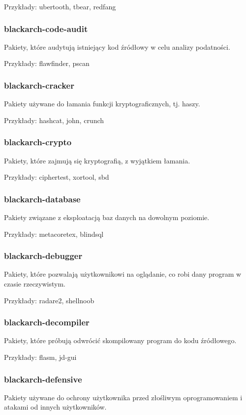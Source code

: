 \documentclass[a4paper, oneside, 11pt]{book}
\begin{document}
Przykłady: ubertooth, tbear, redfang

\subsubsection{blackarch-code-audit}
Pakiety, które audytują istniejący kod źródłowy w celu analizy podatności.

Przykłady: flawfinder, pscan

\subsubsection{blackarch-cracker}
Pakiety używane do łamania funkcji kryptograficznych, tj. haszy.

Przykłady: hashcat, john, crunch

\subsubsection{blackarch-crypto}
Pakiety, które zajmują się kryptografią, z wyjątkiem łamania.

Przykłady: ciphertest, xortool, sbd

\subsubsection{blackarch-database}
Pakiety związane z eksploatacją baz danych na dowolnym poziomie.

Przykłady: metacoretex, blindsql

\subsubsection{blackarch-debugger}
Pakiety, które pozwalają użytkownikowi na oglądanie, co robi dany program w czasie rzeczywistym.

Przykłady: radare2, shellnoob

\subsubsection{blackarch-decompiler}
Pakiety, które próbują odwrócić skompilowany program do kodu źródłowego.

Przykłady: flasm, jd-gui

\subsubsection{blackarch-defensive}
Pakiety używane do ochrony użytkownika przed złośliwym oprogramowaniem i atakami od innych użytkowników.
\end{document}
